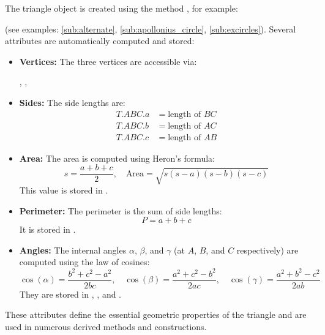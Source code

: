 The triangle object is created using the method , for example:

\begin{center}
\end{center}

(see examples: \ref{sub:alternate}, \ref{sub:apollonius_circle}, \ref{sub:excircles}). Several attributes are automatically computed and stored:

\begin{itemize}
  \item \textbf{Vertices:} The three vertices are accessible via:
  \begin{center}
    , , 
  \end{center}

  \item \textbf{Sides:} The side lengths are:
  \begin{align*}
    T.ABC.a &= \text{length of } BC \\
    T.ABC.b &= \text{length of } AC \\
    T.ABC.c &= \text{length of } AB
  \end{align*}

  \item \textbf{Area:} The area is computed using Heron’s formula:
  \[
    s = \frac{a + b + c}{2}, \quad \text{Area} = \sqrt{s(s - a)(s - b)(s - c)}
  \]
  This value is stored in .

  \item \textbf{Perimeter:} The perimeter is the sum of side lengths:
  \[
    P = a + b + c
  \]
  It is stored in .

  \item \textbf{Angles:} The internal angles $\alpha$, $\beta$, and $\gamma$ (at $A$, $B$, and $C$ respectively) are computed using the law of cosines:
  \[
  \cos(\alpha) = \frac{b^2 + c^2 - a^2}{2bc}, \quad
  \cos(\beta) = \frac{a^2 + c^2 - b^2}{2ac}, \quad
  \cos(\gamma) = \frac{a^2 + b^2 - c^2}{2ab}
  \]
  They are stored in , , and .
\end{itemize}

These attributes define the essential geometric properties of the triangle and are used in numerous derived methods and constructions.


